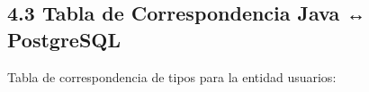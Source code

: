 \documentclass[
]{article}
\begin{document}
\subsection{}

\subsection{}

\subsection{}

\subsection{}

\subsection{}

\subsection{}

\subsection{}

\subsection{4.3 Tabla de Correspondencia Java ↔
PostgreSQL}

Tabla de correspondencia de tipos para la entidad usuarios:
\end{document}
